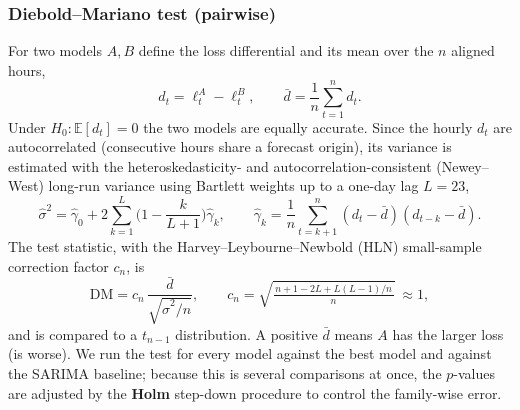 \documentclass[12pt,a4paper,oneside]{report}
\begin{document}
\subsubsection*{Diebold--Mariano test (pairwise)}
For two models $A,B$ \citep{diebold1995comparing} define the loss differential and
its mean over the $n$ aligned hours,
\begin{equation}
  d_t=\ell^A_t-\ell^B_t, \qquad \bar d=\frac1n\sum_{t=1}^{n} d_t .
\end{equation}
Under $H_0:\mathbb{E}[d_t]=0$ the two models are equally accurate. Since the
hourly $d_t$ are autocorrelated (consecutive hours share a forecast origin), its
variance is estimated with the heteroskedasticity- and autocorrelation-consistent
(Newey--West) long-run variance using Bartlett weights up to a one-day lag $L=23$,
\begin{equation}
  \hat\sigma^2=\hat\gamma_0+2\sum_{k=1}^{L}\Big(1-\frac{k}{L+1}\Big)\hat\gamma_k,
  \qquad
  \hat\gamma_k=\frac1n\sum_{t=k+1}^{n}(d_t-\bar d)(d_{t-k}-\bar d).
\end{equation}
The test statistic, with the Harvey--Leybourne--Newbold (HLN) small-sample
correction factor $c_n$, is
\begin{equation}
  \mathrm{DM}=c_n\,\frac{\bar d}{\sqrt{\hat\sigma^2/n}},
  \qquad
  c_n=\sqrt{\tfrac{\,n+1-2L+L(L-1)/n\,}{n}}\ \approx 1,
  \label{eq:dm}
\end{equation}
and is compared to a $t_{n-1}$ distribution. A positive $\bar d$ means $A$ has the
larger loss (is worse). We run the test for every model against the best model and
against the SARIMA baseline; because this is several comparisons at once, the
$p$-values are adjusted by the \textbf{Holm} step-down procedure to control the
family-wise error.
\end{document}
